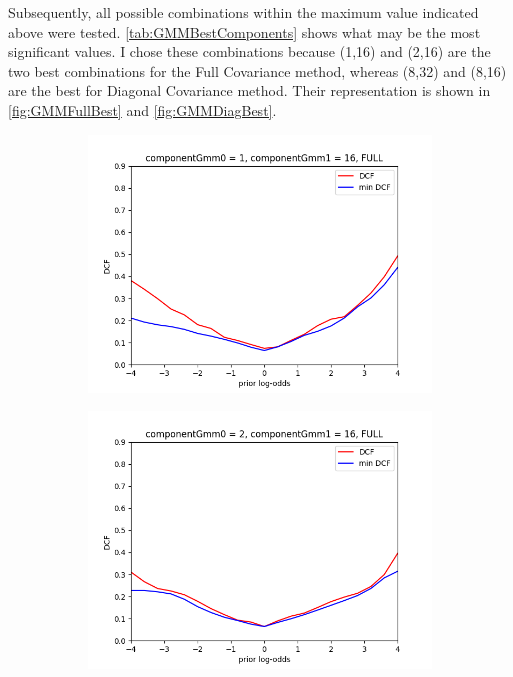 Subsequently, all possible combinations within the maximum value indicated above were tested.
\autoref{tab:GMMBestComponents} shows what may be the most significant values.
I chose these combinations because (1,16) and (2,16) are the two best combinations for the Full Covariance method,
whereas (8,32) and (8,16) are the best for Diagonal Covariance method.
Their representation is shown in \autoref{fig:GMMFullBest} and \autoref{fig:GMMDiagBest}.

\begin{figure}[h!]
    \centering
    \begin{subfigure}[b]{0.23\linewidth}
        \includegraphics[width=\linewidth]{Lab/10. Lab 10/Images/03. 1-16 Full}
        \label{fig:GMM116Full}
    \end{subfigure}
    \begin{subfigure}[b]{0.23\linewidth}
        \includegraphics[width=\linewidth]{Lab/10. Lab 10/Images/04. 2 - 16 Full}

\end{subfigure}
\end{figure}
